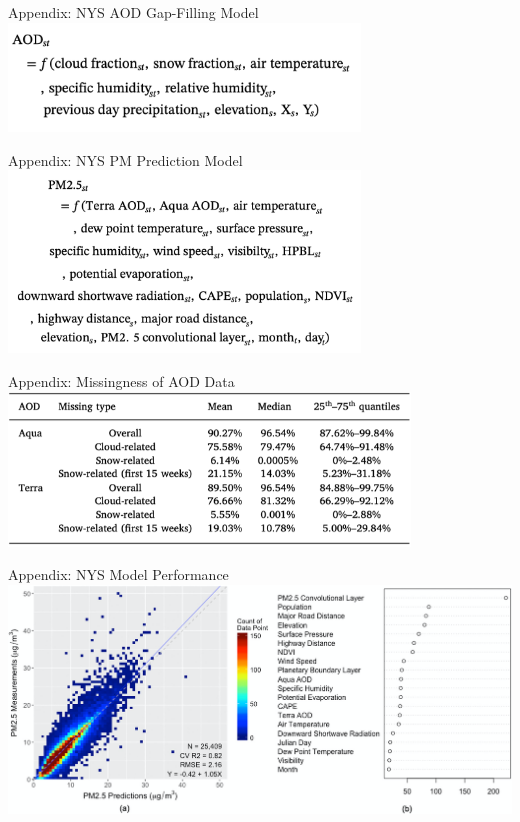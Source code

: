 \appendix
\begin{frame}{Appendix: NYS AOD Gap-Filling Model}
    \centering
    \includegraphics[width=0.7\textwidth]{img/aod_model.png}
\end{frame}
\begin{frame}{Appendix: NYS PM Prediction Model}
    \centering
    \includegraphics[width=0.7\textwidth]{img/pm_model.png}
\end{frame}
\begin{frame}{Appendix: Missingness of AOD Data}
    \centering
    \includegraphics[width=0.8\textwidth]{img/missingness.png}
\end{frame}
\begin{frame}{Appendix: NYS Model Performance}
    \centering
    \includegraphics[width=\textwidth]{img/nys_model.png}
\end{frame}
